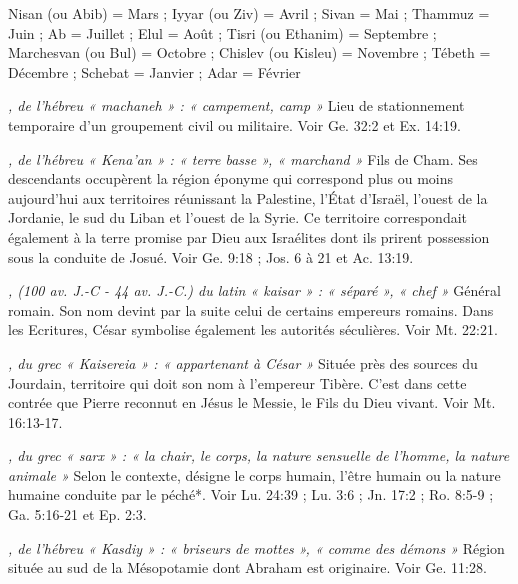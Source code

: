\begin{multicols}{2}
{\textit{}\newline
Nisan (ou Abib) = Mars ; Iyyar (ou Ziv) = Avril ; Sivan = Mai ; Thammuz = Juin ; Ab = Juillet ; Elul = Août ; Tisri (ou Ethanim) = Septembre ; Marchesvan (ou Bul) = Octobre ; Chislev (ou Kisleu) = Novembre ; Tébeth = Décembre ; Schebat = Janvier ; Adar = Février

\textit{, de l'hébreu « machaneh » : « campement, camp »}\newline
Lieu de stationnement temporaire d'un groupement civil ou militaire. Voir Ge. 32:2 et Ex. 14:19.

\textit{, de l'hébreu « Kena'an » : « terre basse », « marchand »}\newline
Fils de Cham. Ses descendants occupèrent la région éponyme qui correspond plus ou moins aujourd'hui aux territoires réunissant la Palestine, l'État d'Israël, l'ouest de la Jordanie, le sud du Liban et l'ouest de la Syrie. Ce territoire correspondait également à la terre promise par Dieu aux Israélites dont ils prirent possession sous la conduite de Josué. Voir Ge. 9:18 ; Jos. 6 à 21 et Ac. 13:19.

\textit{, (100 av. J.-C - 44 av. J.-C.) du latin « kaisar » : « séparé », « chef »}\newline
Général romain. Son nom devint par la suite celui de certains empereurs romains. Dans les Ecritures, César symbolise également les autorités séculières. Voir Mt. 22:21.

\textit{, du grec « Kaisereia » : « appartenant à César »}\newline
Située près des sources du Jourdain, territoire qui doit son nom à l'empereur Tibère. C'est dans cette contrée que Pierre reconnut en Jésus le Messie, le Fils du Dieu vivant. Voir Mt. 16:13-17.

\textit{, du grec « sarx » : « la chair, le corps, la nature sensuelle de l'homme, la nature animale »}\newline
Selon le contexte, désigne le corps humain, l'être humain ou la nature humaine conduite par le péché*. Voir Lu. 24:39 ; Lu. 3:6 ; Jn. 17:2 ; Ro. 8:5-9 ; Ga. 5:16-21 et Ep. 2:3.

\textit{, de l'hébreu « Kasdiy » : « briseurs de mottes », « comme des démons »}\newline
Région située au sud de la Mésopotamie dont Abraham est originaire. Voir Ge. 11:28.

}
\end{multicols}
